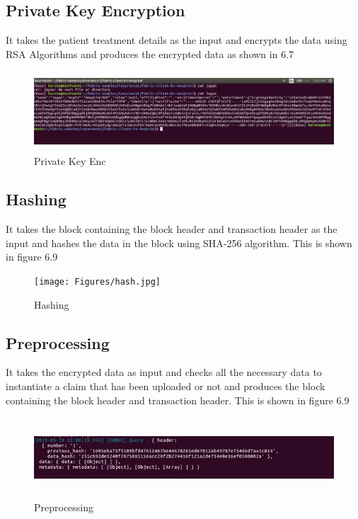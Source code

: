 \subsection{Private Key Encryption}
It takes the patient treatment details as the input and encrypts the data using RSA Algorithms and produces the encrypted data as shown in 6.7
\begin{figure}[htb!]
  \centering
 \includegraphics[width = 15cm, height = 3cm] {Figures/private.jpg}
  \caption{Private Key Enc}
  \label{StH}	
\end{figure}

\subsection{Hashing}
It takes the block containing the block header and transaction header as the input and hashes the data in the block using SHA-256 algorithm. This is shown in figure 6.9
\begin{figure}[htb!]
  \centering
 \texttt{[image: Figures/hash.jpg]}
  \caption{Hashing}
  \label{StH}	
\end{figure}

\subsection{Preprocessing}
It takes the encrypted data as input and checks all the necessary data to instantiate a claim that has been uploaded or not and produces the block containing the block header and transaction header. This is shown in figure 6.9
\begin{figure}[htb!]
  \centering
 \includegraphics[width = 15cm, height = 3cm] {Figures/pe.jpg}
  \caption{Preprocessing}
  \label{StH}	
\end{figure}

